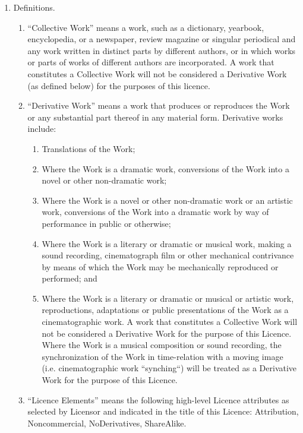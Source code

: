 \begin{enumerate}
\item Definitions.
	\begin{enumerate}
        \item ``Collective Work'' means a work, such as a dictionary, yearbook, encyclopedia, or a newspaper, review magazine or singular periodical and any work written in distinct parts by different authors, or in which works or parts of works of different authors are incorporated. A work that constitutes a Collective Work will not be considered a Derivative Work (as defined below) for the purposes of this licence.
         \item ``Derivative Work'' means a work that produces or reproduces the Work or any substantial part thereof in any material form. Derivative works include:
		\begin{enumerate}
                \item Translations of the Work;
                \item Where the Work is a dramatic work, conversions of the Work into a novel or other non-dramatic work;
                \item Where the Work is a novel or other non-dramatic work or an artistic work, conversions of the Work into a dramatic work by way of performance in public or otherwise;
                \item Where the Work is a literary or dramatic or musical work, making a sound recording, cinematograph film or other mechanical contrivance by means of which the Work may be mechanically reproduced or performed; and
                \item Where the Work is a literary or dramatic or musical or artistic work, reproductions, adaptations or public presentations of the Work as a cinematographic work.
            A work that constitutes a Collective Work will not be considered a Derivative Work for the purpose of this Licence. Where the Work is a musical composition or sound recording, the synchronization of the Work in time-relation with a moving image (i.e. cinematographic work ``synching``) \linebreak will be treated as a Derivative Work for the purpose of this Licence.
		\end{enumerate}
         \item ``Licence Elements'' means the following high-level Licence attributes as selected by Licensor and indicated in the title of this Licence: Attribution, Noncommercial, NoDerivatives, ShareAlike.

\end{enumerate}
\end{enumerate}
